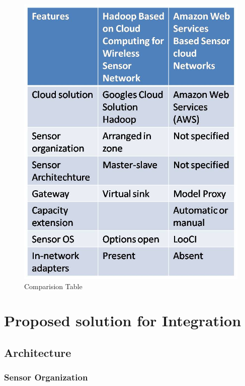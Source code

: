 \documentclass {report}
\begin{document}
\begin{figure}
\begin{center}
\includegraphics [scale=0.6]{architecture}
\caption{Comparision Table}
\end{center}
\end{figure}


\chapter{Proposed solution for Integration}

\section{Architecture}

\subsection{Sensor Organization}
\end{document}
